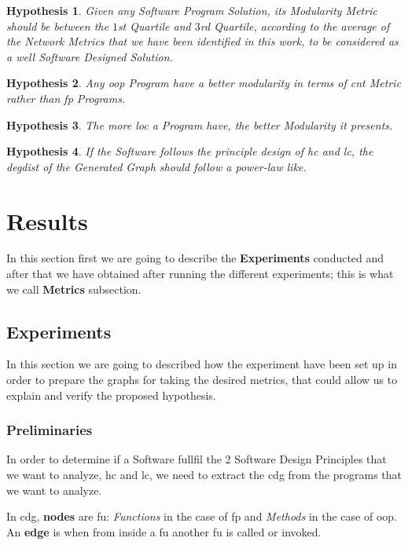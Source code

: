 \documentclass[12pt, a4paper]{article}
\newtheorem{hyp}{Hypothesis}
\begin{document}
\begin{hyp}\label{hip:1}
Given any Software Program Solution, its Modularity Metric should be between the  $1$st Quartile and $3$rd Quartile, according to the average of the Network Metrics that we have been identified in this work,
to be considered as a well Software Designed Solution.
\end{hyp}

\begin{hyp}\label{hip:2}
Any \acrlong{oop} Program have a better modularity in terms of \acrlong{cnt} Metric rather than \acrlong{fp} Programs.
\end{hyp}

\begin{hyp}\label{hip:3}
The more \acrfull{loc} a Program have, the better Modularity it presents.
\end{hyp}
    
\begin{hyp}\label{hip:4}
If the Software follows the principle design of \acrshort{hc} and \acrshort{lc}, the \acrfull{degdist} of the Generated Graph should follow a power-law like.
\end{hyp}

\section{Results}
In this section first we are going to describe the \textbf{Experiments} conducted and after that we have obtained after running the different experiments; this is what we call \textbf{Metrics} subsection.

\subsection{Experiments}
In this section we are going to described how the experiment have been set up in order to prepare the graphs for taking the desired metrics, that could allow us to explain and verify the proposed hypothesis.

\subsubsection{Preliminaries}
In order to determine if a Software fullfil the 2 Software Design Principles that we want to analyze, \acrshort{hc} and \acrshort{lc}, 
we need to extract the \acrfull{cdg} from the programs that we want to analyze.

In \acrshort{cdg}, \textbf{nodes} are \acrlong{fu}: \textit{Functions} in the case of \acrshort{fp} and \textit{Methods} in the case of \acrshort{oop}.
An \textbf{edge} is when from inside a \acrshort{fu} another \acrshort{fu} is called or invoked.
\end{document}
